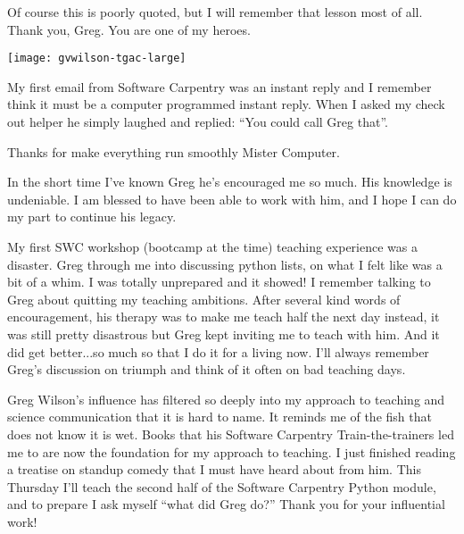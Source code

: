 Of course this is poorly quoted, but I will remember that lesson most of all.
Thank you, Greg. You are one of my heroes.


\newpage

\begin{center}
\texttt{[image: gvwilson-tgac-large]}
\end{center}

My first email from Software Carpentry was an instant reply and I remember
think it must be a computer programmed instant reply. When I asked my check out
helper he simply laughed and replied: ``You could call Greg that''. 

Thanks for make everything run smoothly Mister Computer.


\newpage

In the short time I've known Greg he's encouraged me so much. His knowledge is
undeniable. I am blessed to have been able to work with him, and I hope I can
do my part to continue his legacy.


\newpage

My first SWC workshop (bootcamp at the time) teaching experience was a
disaster.  Greg through me into discussing python lists, on what I felt like
was a bit of a whim.  I was totally unprepared and it showed!  I remember
talking to Greg about quitting my teaching ambitions.  After several kind words
of encouragement, his therapy was to make me teach half the next day instead,
it was still pretty disastrous but Greg kept inviting me to teach with him.
And it did get better...so much so that I do it for a living now.  I'll always
remember Greg's discussion on triumph and think of it often on bad teaching
days. 


\newpage

Greg Wilson's influence has filtered so deeply into my approach to teaching and
science communication that it is hard to name.  It reminds me of the fish that
does not know it is wet.  Books that his Software Carpentry Train-the-trainers
led me to are now the foundation for my approach to teaching.  I just finished
reading a treatise on standup comedy that I must have heard about from him.
This Thursday I'll teach the second half of the Software Carpentry Python
module, and to prepare I ask myself ``what did Greg do?'' Thank you for your
influential work!

